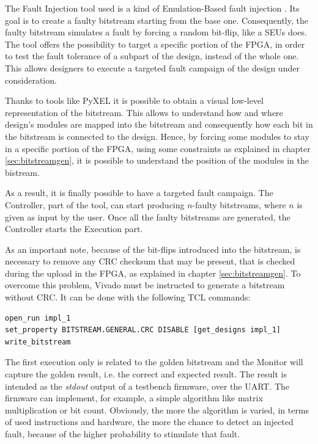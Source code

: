 The Fault Injection tool used is a kind of Emulation-Based fault injection \cite{fit}. Its goal is to create a faulty bitstream starting from the base one. Consequently, the faulty bitstream simulates a fault by forcing a random bit-flip, like a SEUs does. The tool offers the possibility to target a specific portion of the FPGA, in order to test the fault tolerance of a subpart of the design, instead of the whole one. This allows designers to execute a targeted fault campaign of the design under consideration. \bigskip

Thanks to tools like PyXEL \cite{8632000} it is possible to obtain a visual low-level representation of the bitstream. This allows to understand how and where design's modules are mapped into the bitstream and consequently how each bit in the bitstream is connected to the design. Hence, by forcing some modules to stay in a specific portion of the FPGA, using some constraints as explained in chapter \ref{sec:bitstreamgen}, it is possible to understand the position of the modules in the bistream. \bigskip

As a result, it is finally possible to have a targeted fault campaign. The Controller, part of the tool, can start producing $n$-faulty bitstreams, where $n$ is given as input by the user. Once all the faulty bitstreams are generated, the Controller starts the Execution part.\bigskip

As an important note, because of the bit-flips introduced into the bitstream, is necessary to remove any CRC checksum that may be present, that is checked during the upload in the FPGA, as explained in chapter \ref{sec:bitstreamgen}. To overcome this problem, Vivado must be instructed to generate a bitstream without CRC. It can be done with the following TCL commands:

\begin{lstlisting}[style=tcl]
open_run impl_1
set_property BITSTREAM.GENERAL.CRC DISABLE [get_designs impl_1]
write_bitstream
\end{lstlisting}

The first execution only is related to the golden bitstream and the Monitor will capture the golden result, i.e. the correct and expected result. The result is intended as the \textit{stdout} output of a testbench firmware, over the UART. The firmware can implement, for example, a simple algorithm like matrix multiplication or bit count. Obviously, the more the algorithm is varied, in terms of used instructions and hardware, the more the chance to detect an injected fault, because of the higher probability to stimulate that fault. \bigskip

